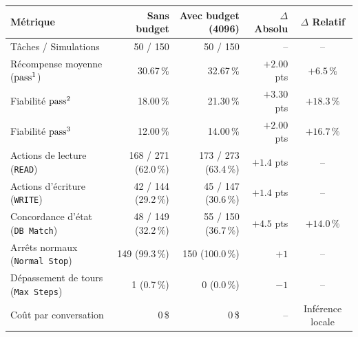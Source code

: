 \begin{tabular}{lrrrc}
\toprule
\textbf{Métrique} & \textbf{Sans budget} & \textbf{Avec budget (4096)} & \textbf{$\Delta$ Absolu} & \textbf{$\Delta$ Relatif} \\
\midrule
Tâches / Simulations & 50 / 150 & 50 / 150 & -- & -- \\
Récompense moyenne ($\text{pass}^{1}$) & 30.67\,\% & 32.67\,\% & $+2.00$ pts & $+6.5\,\%$ \\
Fiabilité $\text{pass}^{2}$ & 18.00\,\% & 21.30\,\% & $+3.30$ pts & $+18.3\,\%$ \\
Fiabilité $\text{pass}^{3}$ & 12.00\,\% & 14.00\,\% & $+2.00$ pts & $+16.7\,\%$ \\
\midrule
Actions de lecture (\texttt{READ}) & 168 / 271 (62.0\,\%) & 173 / 273 (63.4\,\%) & $+1.4$ pts & -- \\
Actions d'écriture (\texttt{WRITE}) & 42 / 144 (29.2\,\%) & 45 / 147 (30.6\,\%) & $+1.4$ pts & -- \\
Concordance d'état (\texttt{DB Match}) & 48 / 149 (32.2\,\%) & 55 / 150 (36.7\,\%) & $+4.5$ pts & $+14.0\,\%$ \\
\midrule
Arrêts normaux (\texttt{Normal Stop}) & 149 (99.3\,\%) & 150 (100.0\,\%) & $+1$ & -- \\
Dépassement de tours (\texttt{Max Steps}) & 1 (0.7\,\%) & 0 (0.0\,\%) & $-1$ & -- \\
Coût par conversation & 0\,\$ & 0\,\$ & -- & Inférence locale \\
\bottomrule
\end{tabular}

